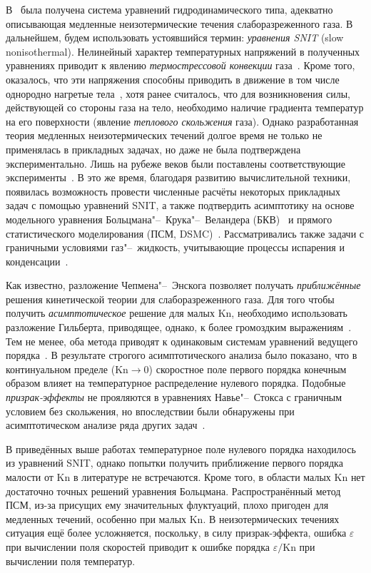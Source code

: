 \documentclass[10pt]{article}
\newcommand{\Kn}{\mathrm{Kn}}
\begin{document}
В~\cite{Kogan1970} была получена система уравнений гидродинамического типа,
адекватно описывающая медленные неизотермические течения слаборазреженного газа.
В дальнейшем, будем использовать устоявшийся термин: \emph{уравнения SNIT} (slow nonisothermal).
Нелинейный характер температурных напряжений в полученных уравнениях приводит к
явлению \emph{термострессовой конвекции} газа~\cite{Kogan1971}.
Кроме того, оказалось, что эти напряжения способны приводить в движение в том числе однородно нагретые тела~\cite{Friedlander1974},
хотя ранее считалось, что для возникновения силы, действующей со стороны газа на тело,
необходимо наличие градиента температур на его поверхности (явление \emph{теплового скольжения} газа).
Однако разработанная теория медленных неизотермических течений долгое время не только не применялась
в прикладных задачах, но даже не была подтверждена экспериментально.
Лишь на рубеже веков были поставлены соответствующие эксперименты~\cite{Friedlander1997, Friedlander2003}.
В это же время, благодаря развитию вычислительной техники, появилась возможность провести численные расчёты
некоторых прикладных задач с помощью уравнений SNIT, а также подтвердить асимптотику на основе модельного уравнения
Больцмана"--~Крука"--~Веландера (БКВ)~\cite{Alexandrov2002, Aoki2006, Alexandrov2008b, Alexandrov2011}
и прямого статистического моделирования (ПСМ, DSMC)~\cite{Alexandrov2008a, Aoki2007}.
Рассматривались также задачи с граничными условиями газ"--~жидкость,
учитывающие процессы испарения и конденсации~\cite{Aoki2007}.

Как известно, разложение Чепмена"--~Энскога позволяет получать \emph{приближённые} решения кинетической теории
для слаборазреженного газа. Для того чтобы получить \emph{асимптотическое} решение для малых \(\Kn\),
необходимо использовать разложение Гильберта, приводящее, однако, к более громоздким выражениям~\cite{Sone2002}.
Тем не менее, оба метода приводят к одинаковым системам уравнений ведущего порядка~\cite{Sone1996}.
В результате строгого асимптотического анализа было показано, что в континуальном пределе (\(\Kn\to0\))
скоростное поле первого порядка конечным образом влияет на температурное распределение нулевого порядка.
Подобные \emph{призрак-эффекты} не прояляются в уравнениях Навье"--~Стокса с граничным условием без скольжения,
но впоследствии были обнаружены при асимптотическом анализе ряда других задач~\cite{Sone2007}.

В приведённых выше работах температурное поле нулевого порядка находилось из уравнений SNIT,
однако попытки получить приближение первого порядка малости от \(\Kn\) в литературе не встречаются.
Кроме того, в области малых \(\Kn\) нет достаточно точных решений уравнения Больцмана.
Распространённый метод ПСМ, из-за присущих ему значительных флуктуаций, плохо пригоден
для медленных течений, особенно при малых \(\Kn\). В неизотермических течениях ситуация
ещё более усложняется, поскольку, в силу призрак-эффекта, ошибка \(\varepsilon\)
при вычислении поля скоростей приводит к ошибке порядка \(\varepsilon/\Kn\) при вычислении поля температур.
\end{document}
